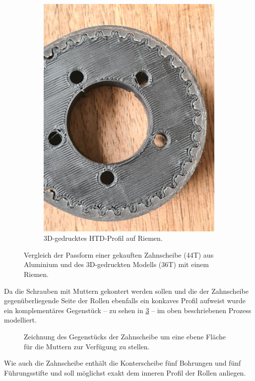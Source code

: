 \begin{figure}[h]
\begin{subfigure}{.49\textwidth}
				\includegraphics[width=\textwidth]{Footage/Pictures/Printed-HTD_tooth_fit.jpg}
				\caption{3D-gedrucktes HTD-Profil auf Riemen.}
				\label{subfig:printed HTD}
			\end{subfigure}
			\caption{Vergleich der Passform einer gekauften Zahnscheibe (44T) aus Aluminium und des 3D-gedruckten Modells (36T) mit einem Riemen.}
			\label{fig:HTD profiles comparison}
		\end{figure}\par\medskip
		Da die Schrauben mit Muttern gekontert werden sollen und die der Zahnscheibe gegenüberliegende Seite der Rollen ebenfalls ein konkaves Profil aufweist wurde ein komplementäres Gegenstück -- zu sehen in \cref{fig:orangatang kegel flat face} -- im oben beschriebenen Prozess modelliert.
		\begin{figure}[h]
			\centering
			
			\caption[Zeichnung des Gegenstücks der Zahnscheibe]{Zeichnung des Gegenstücks der Zahnscheibe um eine ebene Fläche für die Muttern zur Verfügung zu stellen.}
			\label{fig:orangatang kegel flat face}
		\end{figure}
		Wie auch die Zahnscheibe enthält die Konterscheibe fünf Bohrungen und fünf Führungsstifte und soll möglichst exakt dem inneren Profil der Rollen anliegen.
		
